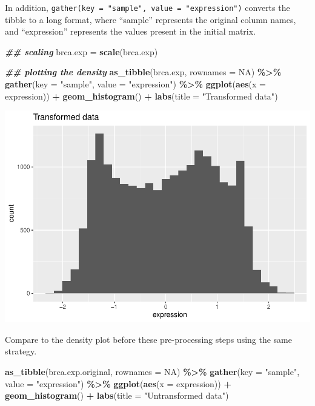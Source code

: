 \documentclass[
]{book}
\newenvironment{Shaded}{\begin{snugshade}}{\end{snugshade}}
\newcommand{\AttributeTok}[1]{\textcolor[rgb]{0.13,0.29,0.53}{#1}}
\newcommand{\ConstantTok}[1]{\textcolor[rgb]{0.56,0.35,0.01}{#1}}
\newcommand{\DocumentationTok}[1]{\textcolor[rgb]{0.56,0.35,0.01}{\textbf{\textit{#1}}}}
\newcommand{\FunctionTok}[1]{\textcolor[rgb]{0.13,0.29,0.53}{\textbf{#1}}}
\newcommand{\NormalTok}[1]{#1}
\newcommand{\OtherTok}[1]{\textcolor[rgb]{0.56,0.35,0.01}{#1}}
\newcommand{\SpecialCharTok}[1]{\textcolor[rgb]{0.81,0.36,0.00}{\textbf{#1}}}
\newcommand{\StringTok}[1]{\textcolor[rgb]{0.31,0.60,0.02}{#1}}
\begin{document}
In addition, \texttt{gather(key\ =\ "sample",\ value\ =\ "expression")} converts the tibble to a long format, where ``sample'' represents the original column names, and ``expression'' represents the values present in the initial matrix.

\begin{Shaded}
\begin{Highlighting}[]
\DocumentationTok{\#\# scaling}
\NormalTok{brca.exp }\OtherTok{=} \FunctionTok{scale}\NormalTok{(brca.exp)}

\DocumentationTok{\#\# plotting the density}
\FunctionTok{as\_tibble}\NormalTok{(brca.exp, }\AttributeTok{rownames =} \ConstantTok{NA}\NormalTok{) }\SpecialCharTok{\%\textgreater{}\%}
  \FunctionTok{gather}\NormalTok{(}\AttributeTok{key =} \StringTok{"sample"}\NormalTok{, }
         \AttributeTok{value =} \StringTok{"expression"}\NormalTok{) }\SpecialCharTok{\%\textgreater{}\%}
  \FunctionTok{ggplot}\NormalTok{(}\FunctionTok{aes}\NormalTok{(}\AttributeTok{x =}\NormalTok{ expression)) }\SpecialCharTok{+}
  \FunctionTok{geom\_histogram}\NormalTok{() }\SpecialCharTok{+}
  \FunctionTok{labs}\NormalTok{(}\AttributeTok{title =} \StringTok{"Transformed data"}\NormalTok{)}
\end{Highlighting}
\end{Shaded}

\includegraphics{_main_files/figure-latex/unnamed-chunk-67-1.pdf}

Compare to the density plot before these pre-processing steps using the same strategy.

\begin{Shaded}
\begin{Highlighting}[]
\FunctionTok{as\_tibble}\NormalTok{(brca.exp.original, }\AttributeTok{rownames =} \ConstantTok{NA}\NormalTok{) }\SpecialCharTok{\%\textgreater{}\%}
  \FunctionTok{gather}\NormalTok{(}\AttributeTok{key =} \StringTok{"sample"}\NormalTok{, }\AttributeTok{value =} \StringTok{"expression"}\NormalTok{) }\SpecialCharTok{\%\textgreater{}\%}
  \FunctionTok{ggplot}\NormalTok{(}\FunctionTok{aes}\NormalTok{(}\AttributeTok{x =}\NormalTok{ expression)) }\SpecialCharTok{+}
  \FunctionTok{geom\_histogram}\NormalTok{() }\SpecialCharTok{+}
  \FunctionTok{labs}\NormalTok{(}\AttributeTok{title =} \StringTok{"Untransformed data"}\NormalTok{)}
\end{Highlighting}
\end{Shaded}
\end{document}
